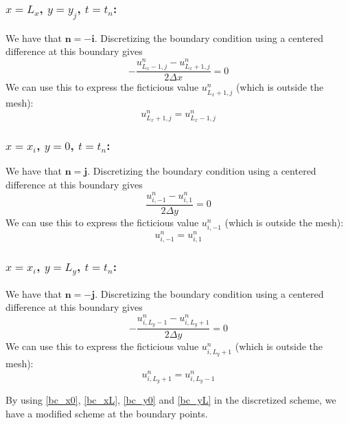 \documentclass[11pt]{article} %
\newcommand{\bn}{\mathbf{n}}
\newcommand{\bi}{\mathbf{i}}
\newcommand{\bj}{\mathbf{j}}
\newcommand{\Dx}{\Delta x}
\newcommand{\Dy}{\Delta y}
\begin{document}
\subsubsection*{ $x=L_x$, $y = y_j$, $t = t_n$:}
 We have that $\bn = -\bi$. Discretizing the boundary condition using a centered difference at this boundary gives
\begin{equation*}
-\frac{u^n_{L_x-1,j} - u^n_{L_x+1,j}}{2\Dx} = 0
\end{equation*}
We can use this to express the ficticious value $u^n_{L_x+1,j}$ (which is outside the mesh):
\begin{equation}
u^n_{L_x+1,j} = u^n_{L_x-1,j}
\label{bc_xL}
\end{equation}

\subsubsection*{ $x=x_i$, $y = 0$, $t = t_n$:}
 We have that $\bn = \bj$. Discretizing the boundary condition using a centered difference at this boundary gives
\begin{equation*}
\frac{u^n_{i,-1} - u^n_{i,1}}{2\Dy} = 0
\end{equation*}
We can use this to express the ficticious value $u^n_{i,-1}$ (which is outside the mesh):
\begin{equation}
u^n_{i,-1} = u^n_{i,1}
\label{bc_y0}
\end{equation}

\subsubsection*{ $x=x_i$, $y = L_y$, $t = t_n$:}
 We have that $\bn = -\bj$. Discretizing the boundary condition using a centered difference at this boundary gives
\begin{equation*}
-\frac{u^n_{i,L_y-1} - u^n_{i,L_y+1}}{2\Dy} = 0
\end{equation*}
We can use this to express the ficticious value $u^n_{i,L_y+1}$ (which is outside the mesh):
\begin{equation}
u^n_{i,L_y+1} = u^n_{i,L_y-1}
\label{bc_yL}
\end{equation}


By using \eqref{bc_x0}, \eqref{bc_xL}, \eqref{bc_y0} and \eqref{bc_yL} in the discretized scheme, we have a modified scheme at the boundary points.
\end{document}
